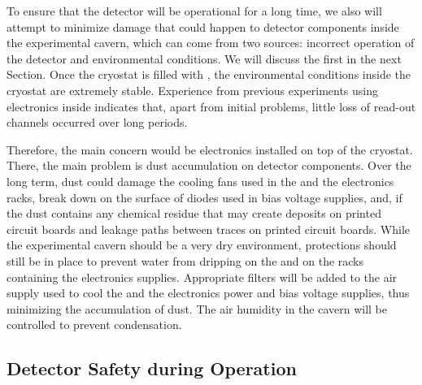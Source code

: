To ensure that the  detector will be operational for a long
time, we also will attempt to minimize 
damage that could happen to detector components inside the 
experimental cavern, which can come from two sources: incorrect
operation of the detector and environmental conditions. We
will discuss the first in the next Section. Once the cryostat is filled with , the environmental
conditions inside the cryostat are extremely stable. Experience from 
previous experiments using electronics inside 
 indicates that, apart from initial problems, little loss of read-out channels occurred over long periods. 

Therefore, the main concern would be electronics 
installed on top of the cryostat. There, the main problem
is dust accumulation on detector components. Over the long
term, dust could damage the cooling fans used
in the  and the  electronics racks, break down 
on the surface of diodes used in bias voltage supplies,
and, if the dust contains any chemical residue that may
create deposits on printed circuit boards and leakage paths
between traces on printed circuit boards. While the
experimental cavern should be a very dry environment,
protections should still be in place to prevent water from 
dripping on the  and on the racks containing the
 electronics supplies. Appropriate filters will be added to the
air supply used to cool the  and the  electronics power and bias voltage supplies, thus minimizing
the accumulation of dust. The air humidity in the cavern 
will be controlled to prevent condensation.

\subsection{Detector Safety during Operation}
\label{sec:fdsp-tpcelec-safety-detops}

